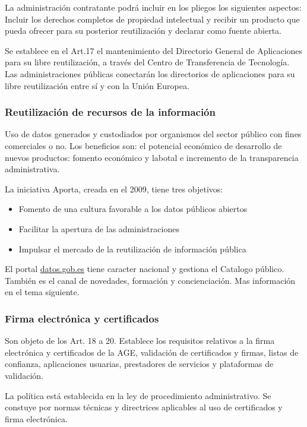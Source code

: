         La administración contratante podrá incluir en los pliegos los siguientes aspectos: Incluir los derechos completos de propiedad intelectual y recibir un producto que pueda ofrecer para su posterior reutilización y declarar como fuente abierta.

        Se establece en el Art.17 el mantenimiento del Directorio General de Aplicaciones para su libre reutilización, a través del Centro de Transferencia de Tecnología. Las administraciones públicas conectarán los directorios de aplicaciones para su libre reutilización entre sí y con la Unión Europea.

    \subsubsection{Reutilización de recursos de la información} %
        Uso de datos generados y custodiados por organismos del sector público con fines comerciales o no. Los beneficios son: el potencial económico de desarrollo de nuevos productos: fomento económico y labotal e incremento de la transparencia administrativa.

        La iniciativa Aporta, creada en el 2009, tiene tres objetivos:
        \begin{itemize}
            \item Fomento de una cultura favorable a los datos públicos abiertos
            \item Facilitar la apertura de las administraciones
            \item Impulsar el mercado de la reutilización de información pública
        \end{itemize}

        El portal \url{datos.gob.es} tiene caracter nacional y gestiona el Catalogo público. También es el canal de novedades, formación y concienciación. Mas información en el tema siguiente.

    \subsubsection{Firma electrónica y certificados} %
        Son objeto de los Art. 18 a 20. Establece los requisitos relativos a la firma electrónica y certificados de la AGE, validación de certificados y firmas, listas de confianza, aplicaciones usuarias, prestadores de servicios y plataformas de validación.

        La política está establecida en la ley de procedimiento administrativo. Se constuye por normas técnicas y directrices aplicables al uso de certificados y firma electrónica.

